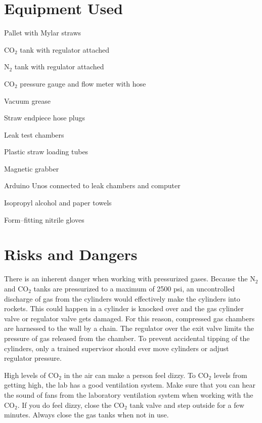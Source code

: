 \documentclass[A4,12pt]{article}
\begin{document}
\section{Equipment Used}
\begin{multicols}{2}
\begin{myitemize}
	\item Pallet with Mylar straws
	\item CO$_2$ tank with regulator attached
	\item N$_2$ tank with regulator attached
	\item CO$_2$ pressure gauge and flow meter with hose 
	\item Vacuum grease
	\item Straw endpiece hose plugs
	\item Leak test chambers
	\item Plastic straw loading tubes
	\item Magnetic grabber
	\item Arduino Unos connected to leak chambers and computer
	\item Isopropyl alcohol and paper towels
	\item Form--fitting nitrile gloves
\end{myitemize}
\end{multicols}


\section{Risks and Dangers}
There is an inherent danger when working with pressurized gases. Because the N$_2$ and CO$_2$ tanks are pressurized to a maximum of 2500 psi, an uncontrolled discharge of gas from the cylinders would effectively make the cylinders into rockets. This could happen in a cylinder is knocked over and the gas cylinder valve or regulator valve gets damaged. For this reason, compressed gas chambers are harnessed to the wall by a chain. The regulator over the exit valve limits the pressure of gas released from the chamber. To prevent accidental tipping of the cylinders, only a trained supervisor should ever move cylinders or adjust regulator pressure. 

High levels of CO$_2$ in the air can make a person feel dizzy. To CO$_2$ levels from getting high, the lab has a good ventilation system. Make sure that you can hear the sound of fans from the laboratory ventilation system when working with the CO$_2$. If you do feel dizzy, close the CO$_2$ tank valve and step outside for a few minutes. Always close the gas tanks when not in use.
\end{document}
